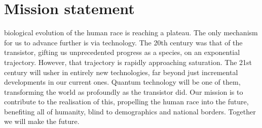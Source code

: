 \section{Mission statement}

 biological evolution of the human race is reaching a plateau. The only mechanism for us to advance further is via technology. The 20th century was that of the transistor, gifting us unprecedented progress as a species, on an exponential trajectory. However, that trajectory is rapidly approaching saturation. The 21st century will usher in entirely new technologies, far beyond just incremental developments in our current ones. Quantum technology will be one of them, transforming the world as profoundly as the transistor did. Our mission is to contribute to the realisation of this, propelling the human race into the future, benefiting all of humanity, blind to demographics and national borders. Together we will make the future.

